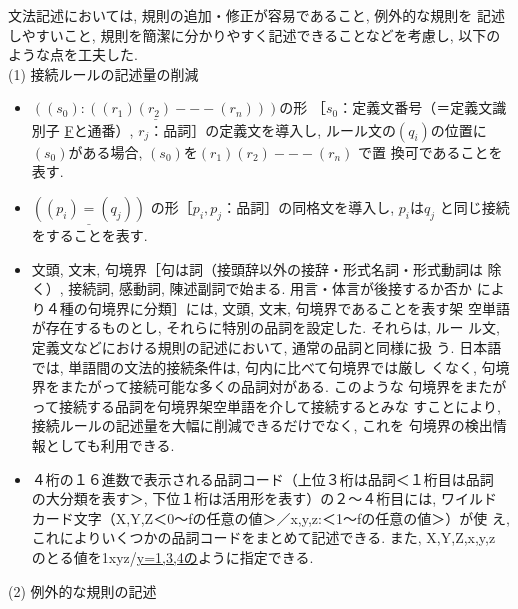  文法記述においては, 規則の追加・修正が容易であること, 例外的な規則を
記述しやすいこと, 規則を簡潔に分かりやすく記述できることなどを考慮し, 
以下のような点を工夫した. \\
(1) 接続ルールの記述量の削減
\begin{itemize}
\item \(\underline{((s_{0}):((r_{1})(r_{2})---(r_{n})))}\)の形
［\(s_{0}\)：定義文番号（＝定義文識別子 \underline{F}と通番）,
\(r_{j}\)：品詞］の定義文を導入し, ルール文の\((q_{i})\)の位置に
\((s_{0})\)がある場合, \((s_{0})\)を\((r_{1})(r_{2})---(r_{n})\) で置
換可であることを表す.

\item \(\underline{((p_{i})=(q_{j}))}\)
の形［\(p_{i},p_{j}\)：品詞］の同格文を導入し, \(p_{i}\)は\(q_{j}\)
と同じ接続をすることを表す.

\item 文頭, 文末, 句境界［句は詞（接頭辞以外の接辞・形式名詞・形式動詞は
除く）, 接続詞, 感動詞, 陳述副詞で始まる. 用言・体言が後接するか否か
により４種の句境界に分類］には, 文頭, 文末, 句境界であることを表す架
空単語が存在するものとし, それらに特別の品詞を設定した. それらは, ルー
ル文, 定義文などにおける規則の記述において, 通常の品詞と同様に扱
う. 日本語では, 単語間の文法的接続条件は, 句内に比べて句境界では厳し
くなく, 句境界をまたがって接続可能な多くの品詞対がある. このような
句境界をまたがって接続する品詞を句境界架空単語を介して接続するとみな
すことにより, 接続ルールの記述量を大幅に削減できるだけでなく, これを
句境界の検出情報としても利用できる.

\item ４桁の１６進数で表示される品詞コード（上位３桁は品詞＜１桁目は品詞
の大分類を表す＞, 下位１桁は活用形を表す）の２〜４桁目には, ワイルド
カード文字（X,Y,Z＜0〜fの任意の値＞／x,y,z:＜1〜fの任意の値＞）が使
え, これによりいくつかの品詞コードをまとめて記述できる. また,
X,Y,Z,x,y,z のとる値を1xyz/\underline{y=1,3,4の}ように指定できる. 
\end{itemize}
(2) 例外的な規則の記述
